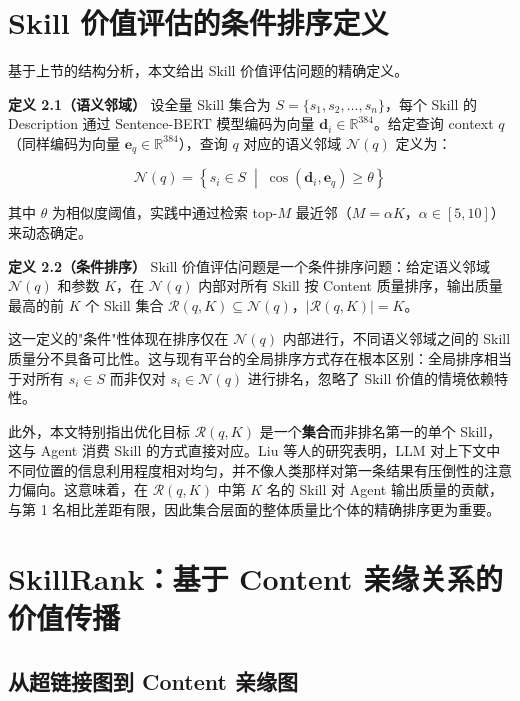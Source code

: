 \section{Skill 价值评估的条件排序定义}
\label{sec:conditional_ranking}

基于上节的结构分析，本文给出 Skill 价值评估问题的精确定义。

\textbf{定义 2.1（语义邻域）} 设全量 Skill 集合为 $S = \{s_1, s_2, \ldots, s_n\}$，每个 Skill 的 Description 通过 Sentence-BERT 模型\cite{reimers2019sentencebert}编码为向量 $\mathbf{d}_i \in \mathbb{R}^{384}$。给定查询 context $q$（同样编码为向量 $\mathbf{e}_q \in \mathbb{R}^{384}$），查询 $q$ 对应的语义邻域 $\mathcal{N}(q)$ 定义为：

\begin{equation}
    \label{eq:neighborhood}
    \mathcal{N}(q) = \left\{ s_i \in S \;\middle|\; \cos(\mathbf{d}_i, \mathbf{e}_q) \geq \theta \right\}
\end{equation}

其中 $\theta$ 为相似度阈值，实践中通过检索 top-$M$ 最近邻（$M = \alpha K$，$\alpha \in [5, 10]$）来动态确定。

\textbf{定义 2.2（条件排序）} Skill 价值评估问题是一个条件排序问题：给定语义邻域 $\mathcal{N}(q)$ 和参数 $K$，在 $\mathcal{N}(q)$ 内部对所有 Skill 按 Content 质量排序，输出质量最高的前 $K$ 个 Skill 集合 $\mathcal{R}(q, K) \subseteq \mathcal{N}(q)$，$|\mathcal{R}(q, K)| = K$。

这一定义的"条件"性体现在排序仅在 $\mathcal{N}(q)$ 内部进行，不同语义邻域之间的 Skill 质量分不具备可比性。这与现有平台的全局排序方式存在根本区别：全局排序相当于对所有 $s_i \in S$ 而非仅对 $s_i \in \mathcal{N}(q)$ 进行排名，忽略了 Skill 价值的情境依赖特性。

此外，本文特别指出优化目标 $\mathcal{R}(q, K)$ 是一个\textbf{集合}而非排名第一的单个 Skill，这与 Agent 消费 Skill 的方式直接对应。Liu 等人的研究\cite{liu2024lostinthemiddle}表明，LLM 对上下文中不同位置的信息利用程度相对均匀，并不像人类那样对第一条结果有压倒性的注意力偏向。这意味着，在 $\mathcal{R}(q, K)$ 中第 $K$ 名的 Skill 对 Agent 输出质量的贡献，与第 1 名相比差距有限，因此集合层面的整体质量比个体的精确排序更为重要。

\section{SkillRank：基于 Content 亲缘关系的价值传播}
\label{sec:skillrank}

\subsection{从超链接图到 Content 亲缘图}

